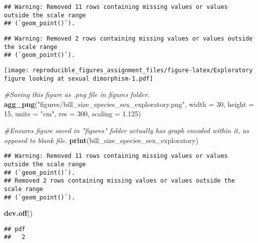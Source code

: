 \documentclass[
]{article}
\newenvironment{Shaded}{\begin{snugshade}}{\end{snugshade}}
\newcommand{\AttributeTok}[1]{\textcolor[rgb]{0.13,0.29,0.53}{#1}}
\newcommand{\CommentTok}[1]{\textcolor[rgb]{0.56,0.35,0.01}{\textit{#1}}}
\newcommand{\DecValTok}[1]{\textcolor[rgb]{0.00,0.00,0.81}{#1}}
\newcommand{\FloatTok}[1]{\textcolor[rgb]{0.00,0.00,0.81}{#1}}
\newcommand{\FunctionTok}[1]{\textcolor[rgb]{0.13,0.29,0.53}{\textbf{#1}}}
\newcommand{\NormalTok}[1]{#1}
\newcommand{\StringTok}[1]{\textcolor[rgb]{0.31,0.60,0.02}{#1}}
\begin{document}
\begin{verbatim}
## Warning: Removed 11 rows containing missing values or values outside the scale range
## (`geom_point()`).
\end{verbatim}

\begin{verbatim}
## Warning: Removed 2 rows containing missing values or values outside the scale range
## (`geom_point()`).
\end{verbatim}

\texttt{[image: reproducible\_figures\_assignment\_files/figure-latex/Exploratory figure looking at sexual dimorphism-1.pdf]}

\begin{Shaded}
\begin{Highlighting}[]
\CommentTok{\#Saving this figure as .png file in figures folder.}
\FunctionTok{agg\_png}\NormalTok{(}\StringTok{"figures/bill\_size\_species\_sex\_exploratory.png"}\NormalTok{, }
        \AttributeTok{width =} \DecValTok{30}\NormalTok{,}
        \AttributeTok{height =} \DecValTok{15}\NormalTok{,}
        \AttributeTok{units =} \StringTok{"cm"}\NormalTok{,}
        \AttributeTok{res =} \DecValTok{300}\NormalTok{,}
        \AttributeTok{scaling =} \FloatTok{1.125}\NormalTok{)}

\CommentTok{\#Ensures figure saved in "figures" folder actually has graph encoded within it, as opposed to blank file.}
\FunctionTok{print}\NormalTok{(bill\_size\_species\_sex\_exploratory)}
\end{Highlighting}
\end{Shaded}

\begin{verbatim}
## Warning: Removed 11 rows containing missing values or values outside the scale range
## (`geom_point()`).
## Removed 2 rows containing missing values or values outside the scale range
## (`geom_point()`).
\end{verbatim}

\begin{Shaded}
\begin{Highlighting}[]
\FunctionTok{dev.off}\NormalTok{()}
\end{Highlighting}
\end{Shaded}

\begin{verbatim}
## pdf 
##   2
\end{verbatim}
\end{document}
